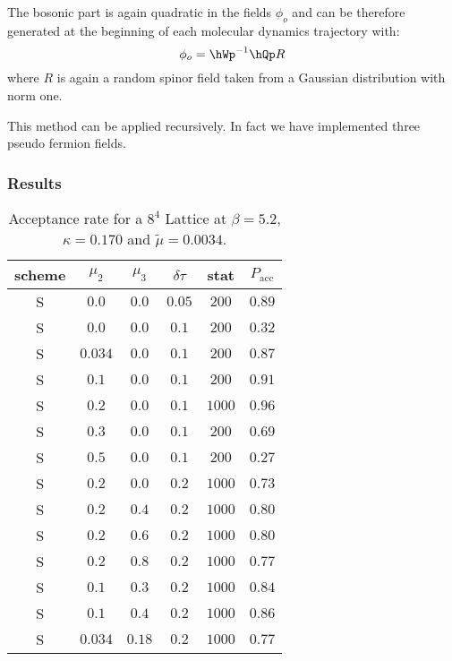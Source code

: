 The bosonic part is again quadratic in the fields $\phi_o$ and can be
therefore generated at the beginning of each molecular dynamics
trajectory with:
\begin{equation}
  \label{eq:mt8}
  \phi_o = \hWp^{-1}\hQp R
\end{equation}
where $R$ is again a random spinor field taken from a Gaussian
distribution with norm one.

This method can be applied recursively. In fact we have implemented
three pseudo fermion fields.

\subsubsection{Results}

\begin{table}[!h]
  \centering
  \begin{tabular}{|c|c|c|c|c|c|}
    \hline
    scheme & $\mu_2$ & $\mu_3$ & $\delta\tau$ & stat & $P_{\textrm{acc}}$ \\
    \hline\hline
    S & $0.0$ & $0.0$ & $0.05$ & $200$ & $0.89$ \\
    \hline
    S & $0.0$ & $0.0$ & $0.1$ & $200$ & $0.32$ \\
    S & $0.034$ & $0.0$ & $0.1$ & $200$ & $0.87$ \\
    S & $0.1$ & $0.0$ & $0.1$ & $200$ & $0.91$ \\
    S & $0.2$ & $0.0$ & $0.1$ & $1000$ & $0.96$ \\
    S & $0.3$ & $0.0$ & $0.1$ & $200$ & $0.69$ \\
    S & $0.5$ & $0.0$ & $0.1$ & $200$ & $0.27$ \\
    \hline
    S & $0.2$ & $0.0$ & $0.2$ & $1000$ & $0.73$ \\
    S & $0.2$ & $0.4$ & $0.2$ & $1000$ & $0.80$\\
    S & $0.2$ & $0.6$ & $0.2$ & $1000$ & $0.80$ \\
    S & $0.2$ & $0.8$ & $0.2$ & $1000$ & $0.77$ \\
    S & $0.1$ & $0.3$ & $0.2$ & $1000$ & $0.84$ \\
    S & $0.1$ & $0.4$ & $0.2$ & $1000$ & $0.86$ \\
    S & $0.034$ & $0.18$ & $0.2$ & $1000$ & $0.77$ \\
    \hline
  \end{tabular}
  \caption{Acceptance rate for a $8^4$ Lattice at $\beta=5.2$, $\kappa=0.170$ and $\tilde\mu = 0.0034$.}
  \label{tab:resmt}
\end{table}

